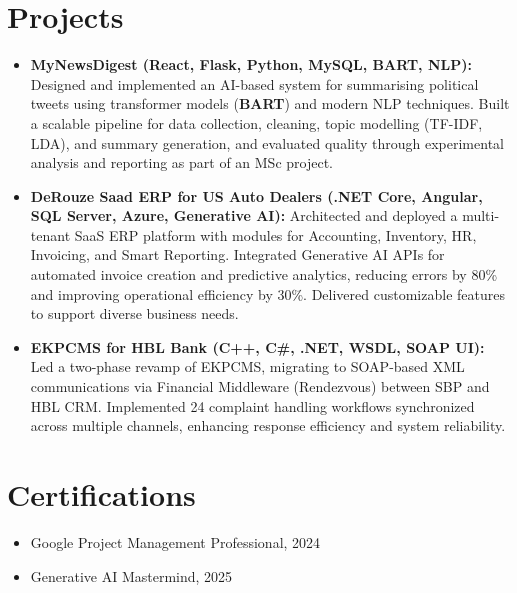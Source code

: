 \documentclass[letterpaper,10pt]{article}
\begin{document}
\section{Projects}
\begin{itemize}
    \setlength\itemsep{3pt}
    \item \textbf{MyNewsDigest (React, Flask, Python, MySQL, BART, NLP):} Designed and implemented an AI-based system for summarising political tweets using transformer models (\textbf{BART}) and modern NLP techniques. Built a scalable pipeline for data collection, cleaning, topic modelling (TF-IDF, LDA), and summary generation, and evaluated quality through experimental analysis and reporting as part of an MSc project.
    \item \textbf{DeRouze Saad ERP for US Auto Dealers (.NET Core, Angular, SQL Server, Azure, Generative AI): } Architected and deployed a multi-tenant SaaS ERP platform with modules for Accounting, Inventory, HR, Invoicing, and Smart Reporting. Integrated Generative AI APIs for automated invoice creation and predictive analytics, reducing errors by 80\% and improving operational efficiency by 30\%. Delivered customizable features to support diverse business needs.
    \item \textbf{EKPCMS for HBL Bank (C++, C\#, .NET, WSDL, SOAP UI):} Led a two-phase revamp of EKPCMS, migrating to SOAP-based XML communications via Financial Middleware (Rendezvous) between SBP and HBL CRM. Implemented 24 complaint handling workflows synchronized across multiple channels, enhancing response efficiency and system reliability.
\end{itemize}

\section{Certifications}
\begin{itemize}
    \item Google Project Management Professional, 2024
    \item Generative AI Mastermind, 2025
\end{itemize}

\vspace*{\fill}
\end{document}
